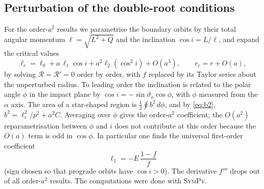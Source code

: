 \documentclass[11pt,a4paper]{article}
\theoremstyle{remark}
\numberwithin{equation}{section}
\begin{document}
\subsection{Perturbation of the double-root conditions}
For the order-$a^2$ results we parametrise the boundary orbits by their total angular momentum
$\ell=\sqrt{L^2+Q}$ and the inclination $\cos i=L/\ell$, and expand the critical values
\begin{equation}
\ell_c=\ell_0+a\,\ell_1\cos i+a^2\ell_2(\cos^2 i)+O(a^3),\qquad r_c=r+O(a),
\end{equation}
by solving $\mathcal R=\mathcal R'=0$ order by order, with $f$ replaced by its Taylor series about the
unperturbed radius. To leading order the inclination is related to the polar angle $\phi$ in the
impact plane by $\cos i=-\sin\vartheta_o\cos\phi$, with $\phi$ measured from the $\alpha$ axis. The area of a star-shaped region is
$\frac12\oint b^2\,d\phi$, and by \eqref{eq:b2}, $b^2=\ell_c^2/p^2+a^2C$. Averaging over $\phi$ gives
the order-$a^2$ coefficient; the $O(a^2)$ reparametrisation between $\phi$ and $i$ does not contribute
at this order because the $O(a)$ term is odd in $\cos\phi$. In particular one finds the universal
first-order coefficient
\begin{equation}
\ell_1=-E\,\frac{1-f}{f}
\label{eq:ell1}
\end{equation}
(sign chosen so that prograde orbits have $\cos i>0$). The derivative $f'''$ drops out of all
order-$a^2$ results. The computations were done with \textsc{SymPy}.
\end{document}
